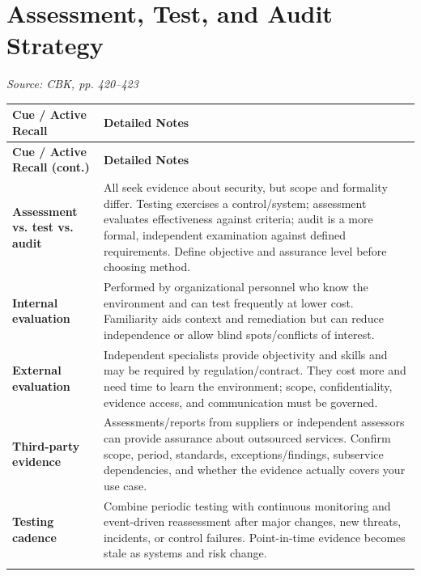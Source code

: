 \documentclass[10pt,letterpaper]{article}
\makeatletter
\newenvironment{cornell}{\rowcolors{2}{white}{notebg}\begin{longtable}{@{}>{\raggedright\arraybackslash\columncolor{cuebg}\color{navy}\bfseries}p{0.285\textwidth}>{\raggedright\arraybackslash}p{0.65\textwidth}@{}}\rowcolor{navy}\color{white}\textbf{Cue / Active Recall} & \color{white}\textbf{Detailed Notes}\\ \hline\endfirsthead\rowcolor{navy}\color{white}\textbf{Cue / Active Recall (cont.)} & \color{white}\textbf{Detailed Notes}\\ \hline\endhead}{\end{longtable}}
\newcommand{\noterow}[2]{#1 & #2\\\arrayrulecolor{line}\hline}\newcommand{\source}[1]{\par{\footnotesize\color{teal}\textit{Source: CBK, #1}}\par}
\makeatother
\begin{document}
\section{\color{navy}Assessment, Test, and Audit Strategy}
\source{pp. 420--423}
\begin{cornell}
\noterow{Assessment vs. test vs. audit}{All seek evidence about security, but scope and formality differ. Testing exercises a control/system; assessment evaluates effectiveness against criteria; audit is a more formal, independent examination against defined requirements. Define objective and assurance level before choosing method.}
\noterow{Internal evaluation}{Performed by organizational personnel who know the environment and can test frequently at lower cost. Familiarity aids context and remediation but can reduce independence or allow blind spots/conflicts of interest.}
\noterow{External evaluation}{Independent specialists provide objectivity and skills and may be required by regulation/contract. They cost more and need time to learn the environment; scope, confidentiality, evidence access, and communication must be governed.}
\noterow{Third-party evidence}{Assessments/reports from suppliers or independent assessors can provide assurance about outsourced services. Confirm scope, period, standards, exceptions/findings, subservice dependencies, and whether the evidence actually covers your use case.}
\noterow{Testing cadence}{Combine periodic testing with continuous monitoring and event-driven reassessment after major changes, new threats, incidents, or control failures. Point-in-time evidence becomes stale as systems and risk change.}
\end{cornell}
\end{document}
